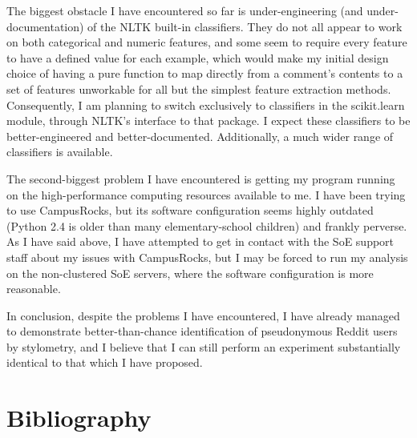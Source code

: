 \documentclass{article}
\begin{document}
The biggest obstacle I have encountered so far is under-engineering (and under-documentation) of the NLTK built-in classifiers. They do not all appear to work on both categorical and numeric features, and some seem to require every feature to have a defined value for each example, which would make my initial design choice of having a pure function to map directly from a comment's contents to a set of features unworkable for all but the simplest feature extraction methods. Consequently, I am planning to switch exclusively to classifiers in the scikit.learn module, through NLTK's interface to that package. I expect these classifiers to be better-engineered and better-documented. Additionally, a much wider range of classifiers is available.

The second-biggest problem I have encountered is getting my program running on the high-performance computing resources available to me. I have been trying to use CampusRocks, but its software configuration seems highly outdated (Python 2.4 is older than many elementary-school children) and frankly perverse. As I have said above, I have attempted to get in contact with the SoE support staff about my issues with CampusRocks, but I may be forced to run my analysis on the non-clustered SoE servers, where the software configuration is more reasonable.

In conclusion, despite the problems I have encountered, I have already managed to demonstrate better-than-chance identification of pseudonymous Reddit users by stylometry, and I believe that I can still perform an experiment substantially identical to that which I have proposed.

\section{Bibliography}

\nocite{*}


\end{document}
